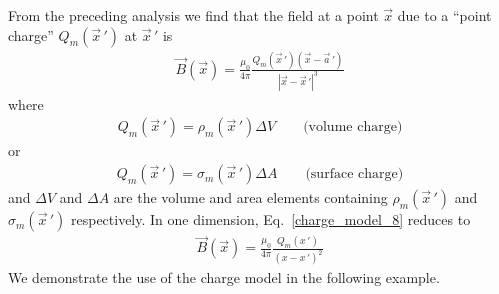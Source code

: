 \documentclass[11pt,a4paper,oneside]{book}
\numberwithin{equation}{section}
\newcommand{\abs}[1]{\left|#1\right|}
\theoremstyle{it}
\theoremstyle{definition}
\begin{document}
From the preceding analysis we find that the field at a point $\vec{x}$ due to a “point charge” $Q_m(\vec{x}\,')$ at $\vec{x}\,'$ is
\begin{equation}\label{charge_model_8}
	{\begin{aligned}
			\vec{B}(\vec{x}) = \frac{\mu_0}{4\pi}\frac{Q_m(\vec{x}\,')(\vec{x}-\vec{a}\,')}{\abs{\vec{x}-\vec{x}\,'}^3}
	\end{aligned}}
\end{equation} 
where 
\begin{equation}\label{charge_model_9}
	{\begin{aligned}
		Q_m(\vec{x}\,') = \rho_m(\vec{x}\,')\Delta V\qquad\text{(volume charge)}
	\end{aligned}}
\end{equation} 
or 
\begin{equation}\label{charge_model_10}
	{\begin{aligned}
			Q_m(\vec{x}\,') = \sigma_m(\vec{x}\,')\Delta A\qquad\text{(surface charge)}
	\end{aligned}}
\end{equation} 
and $\Delta V$ and $\Delta A$ are the volume and area elements containing $\rho_m(\vec{x}\,')$ and $\sigma_m(\vec{x}\,')$ respectively. In one dimension, Eq.~\eqref{charge_model_8} reduces to
\begin{equation}\label{charge_model_11}
	\boxed{\begin{aligned}
			\vec{B}(\vec{x}) = \frac{\mu_0}{4\pi}\frac{Q_m({x}\,')}{({x}-{x}\,')^2}
	\end{aligned}}
\end{equation} 
We demonstrate the use of the charge model in the following example.
\end{document}
